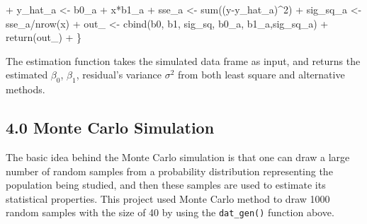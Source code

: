 \documentclass[
]{article}
\newenvironment{Shaded}{\begin{snugshade}}{\end{snugshade}}
\newcommand{\DecValTok}[1]{\textcolor[rgb]{0.00,0.00,0.81}{#1}}
\newcommand{\FunctionTok}[1]{\textcolor[rgb]{0.00,0.00,0.00}{#1}}
\newcommand{\NormalTok}[1]{#1}
\newcommand{\OtherTok}[1]{\textcolor[rgb]{0.56,0.35,0.01}{#1}}
\newcommand{\SpecialCharTok}[1]{\textcolor[rgb]{0.00,0.00,0.00}{#1}}
\begin{document}
\begin{Shaded}
\begin{Highlighting}[]
\SpecialCharTok{+}\NormalTok{   y\_hat\_a }\OtherTok{\textless{}{-}}\NormalTok{ b0\_a }\SpecialCharTok{+}\NormalTok{ x}\SpecialCharTok{*}\NormalTok{b1\_a}
\SpecialCharTok{+}\NormalTok{   sse\_a }\OtherTok{\textless{}{-}} \FunctionTok{sum}\NormalTok{((y}\SpecialCharTok{{-}}\NormalTok{y\_hat\_a)}\SpecialCharTok{\^{}}\DecValTok{2}\NormalTok{)}
\SpecialCharTok{+}\NormalTok{   sig\_sq\_a }\OtherTok{\textless{}{-}}\NormalTok{ sse\_a}\SpecialCharTok{/}\FunctionTok{nrow}\NormalTok{(x)}
\SpecialCharTok{+}\NormalTok{   out\_ }\OtherTok{\textless{}{-}} \FunctionTok{cbind}\NormalTok{(b0, b1, sig\_sq, b0\_a, b1\_a,sig\_sq\_a)}
\SpecialCharTok{+}   \FunctionTok{return}\NormalTok{(out\_)}
\SpecialCharTok{+}\NormalTok{ \}}
\end{Highlighting}
\end{Shaded}

The estimation function takes the simulated data frame as input, and
returns the estimated \(\beta_0\), \(\beta_1\), residual's variance
\(\sigma^2\) from both least square and alternative methods.

\hypertarget{monte-carlo-simulation}{%
\subsection{4.0 Monte Carlo Simulation}\label{monte-carlo-simulation}}

The basic idea behind the Monte Carlo simulation is that one can draw a
large number of random samples from a probability distribution
representing the population being studied, and then these samples are
used to estimate its statistical properties. This project used Monte
Carlo method to draw 1000 random samples with the size of 40 by using
the \texttt{dat\_gen()} function above.
\end{document}
